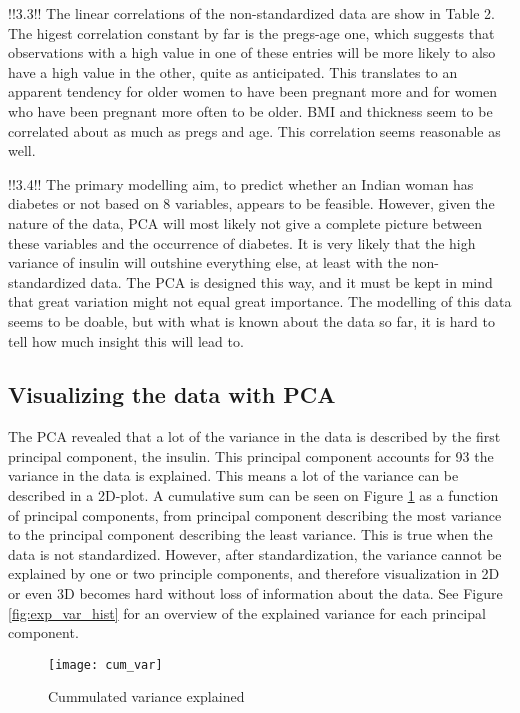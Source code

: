 !!3.3!!
The linear correlations of the non-standardized data are show in Table 2.
The higest correlation constant by far is the pregs-age one, which suggests
that observations with a high value in one of these entries will be more likely
to also have a high value in the other, quite as anticipated. This translates to
an apparent tendency for older women to have been pregnant more and for women
who have been pregnant more often to be older.
BMI and thickness seem to be correlated about as much as pregs and age. This
correlation seems reasonable as well.

!!3.4!!
The primary modelling aim, to predict whether an Indian woman has diabetes or not
based on 8 variables, appears to be feasible. However, given the nature of the
data, PCA will most likely not give a complete picture between these variables
and the occurrence of diabetes. It is very likely that the high variance of
insulin will outshine everything else, at least with the non-standardized
data. The PCA is designed this way, and it must be kept in mind that great
variation might not equal great importance.
The modelling of this data seems to be doable, but with what is known about the data
so far, it is hard to tell how much insight this will lead to.

\subsection{Visualizing the data with PCA}

The PCA revealed that a lot of the variance in the data is described by the
first principal component, the insulin. This principal component accounts for
93%
the variance in the data is explained. This means a lot of the variance can
be described in a 2D-plot. A cumulative sum can be seen on Figure \ref{fig:cumvar} as a
function of principal components, from principal component describing the most
variance to the principal component describing the least variance. This is true
when the data is not standardized. However, after standardization, the variance
cannot be explained by one or two principle components, and therefore visualization
in 2D or even 3D becomes hard without loss of information about the data. See
Figure \ref{fig:exp_var_hist} for an overview of the explained variance for each principal component.

\begin{figure}
  \centering{}
  \texttt{[image: cum\_var]}
  \caption{Cummulated variance explained}\label{fig:cumvar}
\end{figure}

